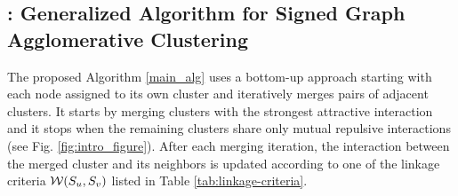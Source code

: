 \subsection{\algname{}: Generalized Algorithm for Signed Graph Agglomerative Clustering} \label{sec:algorithm} 

 The proposed \algname{} Algorithm \ref{main_alg} uses a bottom-up approach starting with each node assigned to its own cluster and iteratively merges pairs of adjacent clusters. It starts by merging clusters with the strongest attractive interaction and it stops when the remaining clusters share only mutual repulsive interactions (see Fig. \hyperref[fig:intro_figure]{\ref*{fig:intro_figure}}). After each merging iteration, the interaction between the merged cluster and its neighbors is updated according to one of the linkage criteria $\mathcal{W}(S_u, S_v)$ listed in Table \ref{tab:linkage-criteria}.

